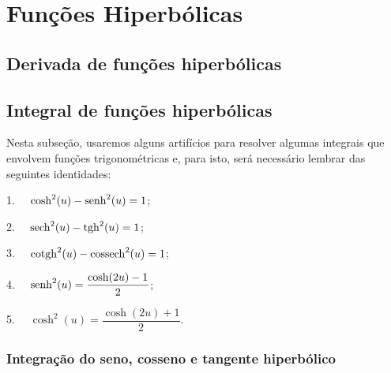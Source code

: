 \cleardoublepage\documentclass[../main.tex]{subfiles}
\begin{document}
\chapter{Funções Hiperbólicas}\label{cap:FuncHyiperb}

\section{Derivada de funções hiperbólicas}
\section{Integral de funções hiperbólicas}
Nesta subseção, usaremos alguns artifícios para resolver algumas integrais que envolvem funções trigonométricas e, para isto, será necessário lembrar das seguintes identidades:
\begin{multicols}{2}
1. \(\quad\cosh^2(u)- {\rm senh}^2(u)=1\);

2. \(\quad{\rm sech}^2(u)- {\rm tgh}^2(u)=1\);

3. \(\quad{\rm cotgh}^2(u) - {\rm cossech}^2(u) =1\);

4. \(\quad{\rm senh}^2(u) = \dfrac{\cosh (2u)-1}{2}\);

5. \(\quad\cosh^2(u) = \dfrac{\cosh(2u)+1}{2} \).
\end{multicols}
\subsection{Integração do seno, cosseno e tangente hiperbólico}

\subsection[\formula{Integrais do tipo $\int{\rm senh}^m(x) \cosh^n(x)\,dx$ }]{}
\end{document}
